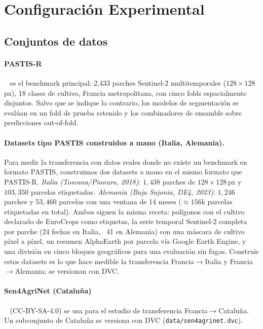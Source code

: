 \section{Configuración Experimental}
\label{sec:experiments}

\subsection{Conjuntos de datos}
\paragraph{PASTIS-R}~\cite{garnot2021pastis} es el benchmark principal:
2{,}433 parches Sentinel-2 multitemporales ($128\times128$ px), 18 clases
de cultivo, Francia metropolitana, con cinco folds espacialmente
disjuntos. Salvo que se indique lo contrario, los modelos de
segmentación se evalúan en un fold de prueba retenido y los combinadores
de ensamble sobre predicciones out-of-fold.

\paragraph{Datasets tipo PASTIS construidos a mano (Italia, Alemania).}
Para medir la transferencia con datos reales donde no existe un benchmark en
formato PASTIS, construimos dos datasets a mano en el mismo formato que PASTIS-R.
\emph{Italia (Toscana/Pianura, 2018)}: $1{,}438$ parches de $128\times128$\,px y
$103{,}350$ parcelas etiquetadas. \emph{Alemania (Baja Sajonia, DE4, 2023)}:
$1{,}246$ parches y $53{,}460$ parcelas con una ventana de 14 meses ($\approx156$k
parcelas etiquetadas en total). Ambos siguen la misma receta: polígonos con el
cultivo declarado de EuroCrops como etiquetas, la serie temporal Sentinel-2
completa por parche (24 fechas en Italia, ~41 en Alemania) con una máscara de
cultivo píxel a píxel, un resumen AlphaEarth por parcela vía Google Earth Engine,
y una división en cinco bloques geográficos para una evaluación sin fugas.
Construir estos datasets es lo que hace medible la transferencia
Francia$\rightarrow$Italia y Francia$\rightarrow$Alemania; se versionan con DVC.

\paragraph{Sen4AgriNet (Cataluña)}~\cite{sykas2022sen4agrinet}
(CC-BY-SA-4.0) se usa para el estudio de transferencia
Francia$\rightarrow$Cataluña. Un subconjunto de Cataluña se versiona con
DVC (\texttt{data/sen4agrinet.dvc}).

